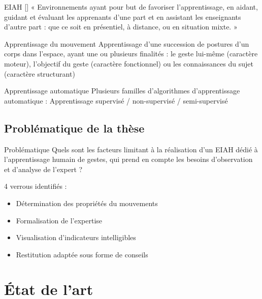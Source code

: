\documentclass[svgnames]{beamer}
\newcommand{\mycite}[1]{[\textit{\cite{#1}}]}
\begin{document}
	\begin{frame}{\secname}
	    \begin{block}{EIAH \mycite{Tchounikine2009PdR}}
	    « Environnements ayant pour but de favoriser l'apprentissage, en aidant, guidant et évaluant les apprenants d'une part et en assistant les enseignants d'autre part : que ce soit en présentiel, à distance, ou en situation mixte. »
	    \end{block}

	\begin{block}{Apprentissage du mouvement}
		 Apprentissage d'une succession de postures d'un corps dans l'espace, ayant une ou plusieurs finalités : le geste lui-même (caractère moteur), l'objectif du geste (caractère fonctionnel) ou les connaissances du sujet (caractère structurant)
	\end{block}
		
		\begin{block}{Apprentissage automatique}
		Plusieurs familles d'algorithmes d'apprentissage automatique : Apprentissage supervisé / non-supervisé / semi-supervisé
		\end{block}
	\end{frame}
	
	\subsection{Problématique de la thèse}
	\begin{frame}{Problématique}
		Quels sont les facteurs limitant à la réalisation d'un EIAH dédié à l'apprentissage humain de gestes, qui prend en compte les besoins d'observation et d'analyse de l'expert ?\\
		
		\vspace{1cm}		
		
		4 verrous identifiés :
		\begin{itemize}[label=$\bullet$]
			\item Détermination des propriétés du mouvements
			\item Formalisation de l'expertise
			\item Visualisation d'indicateurs intelligibles
			\item Restitution adaptée sous forme de conseils
		\end{itemize}
	\end{frame}
	
	
	\section{État de l'art}
\end{document}
